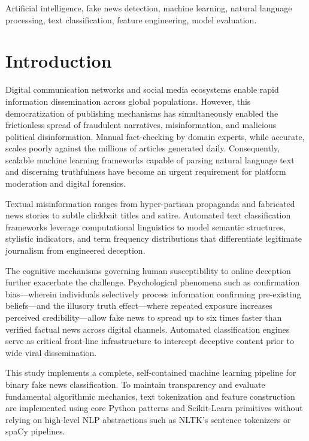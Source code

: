 \documentclass[conference]{IEEEtran}
\begin{document}
\begin{IEEEkeywords}
Artificial intelligence, fake news detection, machine learning, natural language processing, text classification, feature engineering, model evaluation.
\end{IEEEkeywords}

\section{Introduction}
Digital communication networks and social media ecosystems enable rapid information dissemination across global populations. However, this democratization of publishing mechanisms has simultaneously enabled the frictionless spread of fraudulent narratives, misinformation, and malicious political disinformation. Manual fact-checking by domain experts, while accurate, scales poorly against the millions of articles generated daily. Consequently, scalable machine learning frameworks capable of parsing natural language text and discerning truthfulness have become an urgent requirement for platform moderation and digital forensics.

Textual misinformation ranges from hyper-partisan propaganda and fabricated news stories to subtle clickbait titles and satire. Automated text classification frameworks leverage computational linguistics to model semantic structures, stylistic indicators, and term frequency distributions that differentiate legitimate journalism from engineered deception.

The cognitive mechanisms governing human susceptibility to online deception further exacerbate the challenge. Psychological phenomena such as confirmation bias---wherein individuals selectively process information confirming pre-existing beliefs---and the illusory truth effect---where repeated exposure increases perceived credibility---allow fake news to spread up to six times faster than verified factual news across digital channels. Automated classification engines serve as critical front-line infrastructure to intercept deceptive content prior to wide viral dissemination.

This study implements a complete, self-contained machine learning pipeline for binary fake news classification. To maintain transparency and evaluate fundamental algorithmic mechanics, text tokenization and feature construction are implemented using core Python patterns and Scikit-Learn primitives without relying on high-level NLP abstractions such as NLTK's sentence tokenizers or spaCy pipelines.
\end{document}
